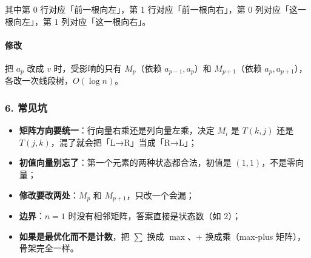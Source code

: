 其中第 $0$ 行对应「前一根向左」，第 $1$ 行对应「前一根向右」，第 $0$ 列对应「这一根向左」，第 $1$ 列对应「这一根向右」。

\paragraph{修改}
把 $a_p$ 改成 $v$ 时，受影响的只有 $M_p$（依赖 $a_{p-1},a_p$）和 $M_{p+1}$（依赖 $a_p,a_{p+1}$），各改一次线段树，$O(\log n)$。

\subsubsection*{6. 常见坑}

\begin{itemize}
    \item \textbf{矩阵方向要统一}：行向量右乘还是列向量左乘，决定 $M_i$ 是 $T(k,j)$ 还是 $T(j,k)$，混了就会把「L→R」当成「R→L」；
    \item \textbf{初值向量别忘了}：第一个元素的两种状态都合法，初值是 $(1,1)$，不是零向量；
    \item \textbf{修改要改两处}：$M_p$ 和 $M_{p+1}$，只改一个会漏；
    \item \textbf{边界}：$n=1$ 时没有相邻矩阵，答案直接是状态数（如 2）；
    \item \textbf{如果是最优化而不是计数}，把 $\sum$ 换成 $\max$、$+$ 换成乘（max-plus 矩阵），骨架完全一样。
\end{itemize}
